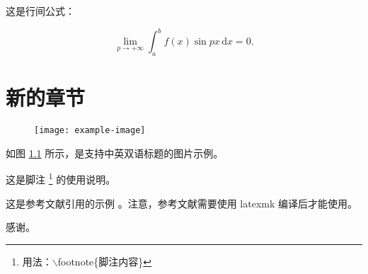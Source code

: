 \documentclass{ecnuthesis}
\begin{document}
这是行间公式：

\[
  \lim_{p\to+\infty}\int_{a}^{b}f(x)\sin{px}\,\mathrm{d}x = 0.
\]

\chapter{新的章节}

\blindtext

\blindtext

\blindtext

\blindtext

\begin{figure}
    \centering
    \texttt{[image: example-image]}
    \label{example}
  \end{figure}

如图 \ref{example} 所示，是支持中英双语标题的图片示例。

这是脚注 \footnote{用法：\ttfamily$\backslash$footnote\{脚注内容\}} 的使用说明。

这是参考文献引用的示例 \cite{Yang_Hy200215, Zheng_wb200108}。注意，参考文献需要使用 {\ttfamily latexmk} 编译后才能使用。

\backmatter
\PrintReference

\begin{appendix}
  \blindtext
\end{appendix}

\begin{acknowledgement}
  感谢。
\end{acknowledgement}
\end{document}
